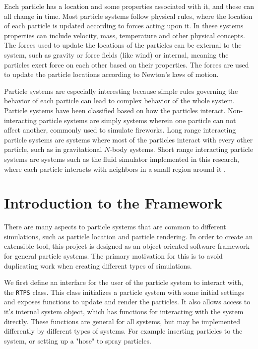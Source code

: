 Each particle has a location and some properties associated with it, and these
can all change in time. Most particle systems follow physical rules, where the
location of each particle is updated according to forces acting upon it. In
these systems properties can include velocity, mass, temperature and other
physical concepts. The forces used to update the locations of the particles can
be external to the system, such as gravity or force fields (like wind) or
internal, meaning the particles exert force on each other based on their
properties. The forces are used to update the particle locations according to
Newton's laws of motion.


Particle systems are especially interesting because simple rules governing the
behavior of each particle can lead to complex behavior of the whole system.
Particle systems have been classified based on how the particles interact.
Non-interacting particle systems are simply systems wherein one particle can
not affect another, commonly used to simulate fireworks. Long range interacting
particle systems are systems where most of the particles interact with every
other particle, such as in gravitational $N$-body systems.  Short range
interacting particle systems are systems such as the fluid simulator
implemented in this research, where each particle interacts with neighbors in a
small region around it \cite{Knowles2009}.




\section{Introduction to the Framework}

There are many aspects to particle systems that are common to different
simulations, such as particle location and particle rendering. In order to
create an extensible tool, this project is designed as an object-oriented
software framework for general particle systems.  The primary motivation for
this is to avoid duplicating work when creating different types of simulations.


We first define an interface for the user of the particle system to interact
with, the \verb|RTPS| class. This class initializes a particle system with some
initial settings and exposes functions to update and render the particles. It
also allows access to it's internal system object, which has functions for
interacting with the system directly. These functions are general for all
systems, but may be implemented differently by different types of systems. For
example inserting particles to the system, or setting up a "hose" to 
spray particles.


